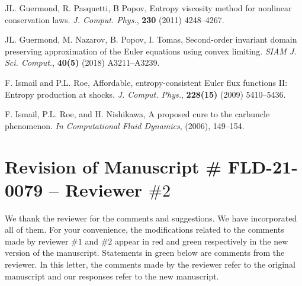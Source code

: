 \documentclass[english,11pt]{article}
\begin{document}
\begin{thebibliography}{99}
    JL. Guermond, R. Pasquetti, B Popov,
    Entropy viscosity method for nonlinear conservation laws.
    {\it J. Comput. Phys.}, {\bf 230} (2011) 4248--4267.

      JL. Guermond, M. Nazarov, B. Popov, I. Tomas,
      Second-order invariant domain preserving approximation of the Euler equations using convex limiting.
      {\it SIAM J. Sci. Comput.}, {\bf 40(5)} (2018) A3211--A3239.

      F. Ismail and P.L. Roe,
      Affordable, entropy-consistent Euler flux functions II: Entropy production at shocks.
      {\it J. Comput. Phys.}, {\bf 228(15)} (2009) 5410--5436.

      F. Ismail, P.L. Roe, and H. Nishikawa,
      A proposed cure to the carbuncle phenomenon.
      {\it In Computational Fluid Dynamics}, (2006), 149--154.
\end{thebibliography}

%
%
%
%

\newpage
\section*{Revision of Manuscript \# FLD-21-0079 -- Reviewer $\#2$}
We thank the reviewer for the comments and suggestions.
We have incorporated all of them.  For your convenience,
the modifications related to the comments made by reviewer $\#1$ and $\#2$
appear in red and green respectively in the new version of the manuscript.
Statements in green below are comments from the reviewer.
In this letter, the comments made by the reviewer refer to the original
manuscript and our responses refer to the new manuscript.
\end{document}
